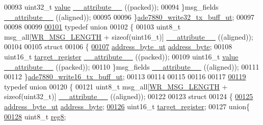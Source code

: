 \begin{DoxyCode}
00093     uint32\_t        \hyperlink{a00041_a638e4503e0ae6ce655b7ad2e17e8f0ad}{value} \hyperlink{a00041_a93c867902b57f5986f7dc397bd28f600}{\_\_attribute\_\_} ((packed));
00094     \}msg\_fields  \hyperlink{a00041_a93c867902b57f5986f7dc397bd28f600}{\_\_attribute\_\_} ((aligned));
00095     
00096 \}\hyperlink{a00018}{ade7880\_write32\_tx\_buff\_ut};
00097 
00098 
00099 
\hypertarget{a00041_source_l00101}{}\hyperlink{a00017}{00101} \textcolor{keyword}{typedef} \textcolor{keyword}{union}
00102 \{
00103     uint8\_t msg\_all[\hyperlink{a00041_ac85ecf34a5cbd85d6dbd51b4c9a5469e}{WR\_MSG\_LENGTH} + \textcolor{keyword}{sizeof}(uint16\_t)]  
      \hyperlink{a00041_a93c867902b57f5986f7dc397bd28f600}{\_\_attribute\_\_} ((aligned));
00104     
00105     \textcolor{keyword}{struct}
00106     \{   
\hypertarget{a00041_source_l00107}{}\hyperlink{a00017_af6a65bac733ea3e9b1d24b065163d49a}{00107}     \hyperlink{a00011}{address\_byte\_ut} \hyperlink{a00017_af6a65bac733ea3e9b1d24b065163d49a}{address\_byte};
00108     uint16\_t        \hyperlink{a00041_ac02048009fa6718e40f028b6bae63f3d}{target\_register} \hyperlink{a00041_a93c867902b57f5986f7dc397bd28f600}{\_\_attribute\_\_} ((packed));
00109     uint16\_t        \hyperlink{a00041_a638e4503e0ae6ce655b7ad2e17e8f0ad}{value} \hyperlink{a00041_a93c867902b57f5986f7dc397bd28f600}{\_\_attribute\_\_} ((packed));
00110     \}msg\_fields  \hyperlink{a00041_a93c867902b57f5986f7dc397bd28f600}{\_\_attribute\_\_} ((aligned));
00111     
00112 \}\hyperlink{a00017}{ade7880\_write16\_tx\_buff\_ut};
00113 
00114 
00115 
00116 
00117 
\hypertarget{a00041_source_l00119}{}\hyperlink{a00019}{00119} \textcolor{keyword}{typedef} \textcolor{keyword}{union}
00120 \{
00121     uint8\_t msg\_all[\hyperlink{a00041_ac85ecf34a5cbd85d6dbd51b4c9a5469e}{WR\_MSG\_LENGTH} + \textcolor{keyword}{sizeof}(uint32\_t)]  
      \hyperlink{a00041_a93c867902b57f5986f7dc397bd28f600}{\_\_attribute\_\_} ((aligned));
00122     
00123     \textcolor{keyword}{struct}
00124     \{   
\hypertarget{a00041_source_l00125}{}\hyperlink{a00019_af6a65bac733ea3e9b1d24b065163d49a}{00125}     \hyperlink{a00011}{address\_byte\_ut} \hyperlink{a00019_af6a65bac733ea3e9b1d24b065163d49a}{address\_byte};
\hypertarget{a00041_source_l00126}{}\hyperlink{a00019_ac02048009fa6718e40f028b6bae63f3d}{00126}     uint16\_t        \hyperlink{a00019_ac02048009fa6718e40f028b6bae63f3d}{target\_register};
00127         \textcolor{keyword}{union}\{
\hypertarget{a00041_source_l00128}{}\hyperlink{a00019_a90b3f782e917edca7101e7803a3773b7}{00128}         uint8\_t         \hyperlink{a00019_a90b3f782e917edca7101e7803a3773b7}{reg8};

\end{DoxyCode}
